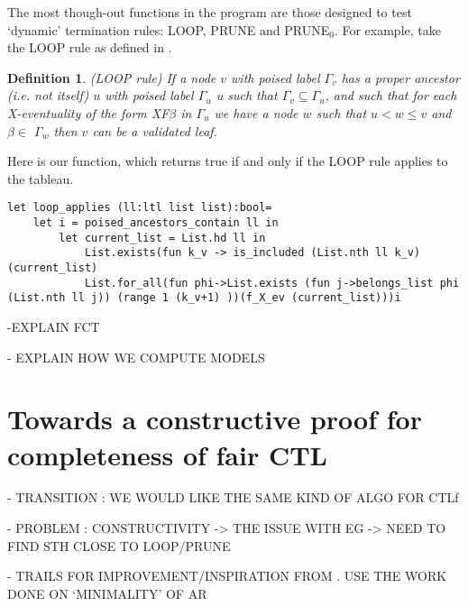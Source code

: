 \documentclass[11pt]{article}
\newtheorem*{definition}{Definition}
\begin{document}
The most though-out functions in the program are those designed to test `dynamic'
termination rules: LOOP, PRUNE and PRUNE$_0$. For example, take the LOOP rule as defined in 
\cite{ReyLTL}. 
\begin{definition}
    \emph{(LOOP rule)}
    If a node $v$ with poised label $\Gamma_v$ has a proper ancestor (i.e. not itself) $u$ with
poised label $\Gamma_u$ u such that $\Gamma_v \subseteq \Gamma_u$, and such that for each X-eventuality of the form XF$\beta$ in $\Gamma_u$ we
have a node $w$ such that $u < w \leq v $ and $\beta \in$ $\Gamma_w$ then $v$ can be a validated leaf.
\end{definition}
Here is our function, which returns true if and only if the LOOP rule
applies to the tableau.
\begin{lstlisting}
let loop_applies (ll:ltl list list):bool=
    let i = poised_ancestors_contain ll in
        let current_list = List.hd ll in
            List.exists(fun k_v -> is_included (List.nth ll k_v)(current_list) 
            List.for_all(fun phi->List.exists (fun j->belongs_list phi (List.nth ll j)) (range 1 (k_v+1) ))(f_X_ev (current_list)))i
\end{lstlisting}

-EXPLAIN FCT

- EXPLAIN HOW WE COMPUTE MODELS


\section{Towards a constructive proof for completeness of fair CTL}

- TRANSITION : WE WOULD LIKE THE SAME KIND OF ALGO FOR CTLf

- PROBLEM : CONSTRUCTIVITY -> THE ISSUE WITH EG -> NEED TO FIND STH CLOSE TO LOOP/PRUNE

- TRAILS FOR IMPROVEMENT/INSPIRATION FROM \cite{GhivG16}. USE THE WORK DONE ON `MINIMALITY' OF AR




\end{document}
